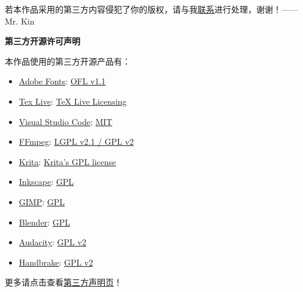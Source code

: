 若本作品采用的第三方内容侵犯了你的版权，请与我\hyperlink{contact}{联系}进行处理，谢谢！——Mr. Kin

\begin{center}
    {\bfseries\sffamily\Large 第三方开源许可声明}
\end{center}

\noindent 本作品使用的第三方开源产品有：
\begin{multicols}{2}
\begin{itemize}
    \item \href{https://github.com/adobe-fonts}{Adobe Fonts}: \href{http://scripts.sil.org/cms/scripts/page.php?site_id=nrsi&id=OFL}{OFL v1.1}
    \item \href{https://tug.org/texlive/}{Tex Live}: \href{https://tug.org/texlive/copying.html}{TeX Live Licensing}
    \item \href{https://code.visualstudio.com/}{Visual Studio Code}: \href{https://www.mit-license.org/}{MIT}
    \item \href{http://ffmpeg.org/}{FFmpeg}: \href{http://ffmpeg.org/legal.html}{LGPL v2.1 / GPL v2}
    \item \href{https://krita.org/en/}{Krita}: \href{https://docs.krita.org/en/KritaFAQ.html?highlight=license#license-rights-and-the-krita-foundation}{Krita's GPL license}
    \item \href{https://inkscape.org/}{Inkscape}: \href{https://inkscape.org/about/license/}{GPL}
    \item \href{https://www.gimp.org}{GIMP}: \href{https://www.gimp.org/about/COPYING}{GPL}
    \item \href{https://www.blender.org}{Blender}: \href{https://www.blender.org/about/license/}{GPL}
    \item \href{https://www.audacityteam.org/}{Audacity}: \href{https://www.gnu.org/licenses/old-licenses/gpl-2.0.en.html}{GPL v2}
    \item \href{https://handbrake.fr}{Handbrake}: \href{https://github.com/HandBrake/HandBrake/blob/master/LICENSE}{GPL v2}
\end{itemize}
\end{multicols}

\noindent 更多请点击查看\href{https://mister-kin.github.io/about/third-party-declaration/}{第三方声明页}！
